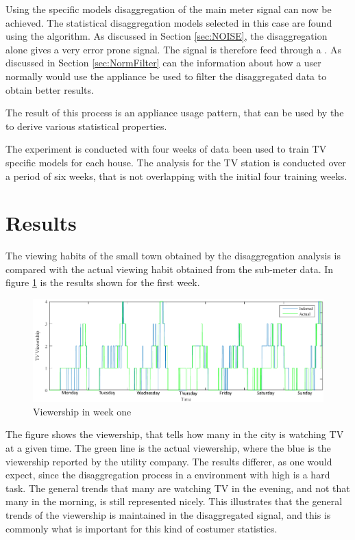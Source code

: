 Using the specific models disaggregation of the main meter signal can now be achieved. The statistical disaggregation models selected in this case are found using the  algorithm. As discussed in Section \ref{sec:NOISE}, the disaggregation alone gives a very error prone signal. The signal is therefore feed through a . As discussed in Section \ref{sec:NormFilter} can the information about how a user normally would use the appliance be used to filter the disaggregated data to obtain better results. 

The result of this process is an appliance usage pattern, that can be used by the  to derive various statistical properties.  

The experiment is conducted with four weeks of data been used to train TV specific models for each house. The analysis for the TV station is conducted over a period of six weeks, that is not overlapping with the initial four training weeks. 

\section{Results}
The viewing habits of the small town obtained by the disaggregation analysis is compared with the actual viewing habit obtained from the sub-meter data. In figure \ref{fig:WHW} is the results shown for the first week.   

\begin{figure}[H]
\centering
\includegraphics[width=1\textwidth]{billeder/Viewership.png}
\caption{Viewership in week one}
\label{fig:WHW}
\end{figure}

The figure shows the viewership, that tells how many in the city is watching TV at a given time. The green line is the actual viewership, where the blue is the viewership reported by the utility company. The results differer, as one would expect, since the disaggregation process in a environment with high  is a hard task. The general trends that many are watching TV in the evening, and not that many in the morning, is still represented nicely. This illustrates that the general trends of the viewership is maintained in the disaggregated signal, and this is commonly what is important for this kind of costumer statistics. 

